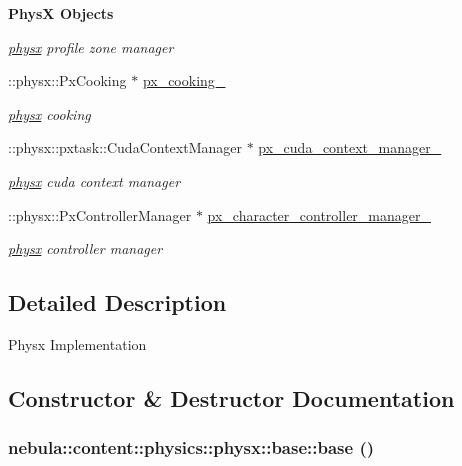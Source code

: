 \begin{Indent}{\bf PhysX Objects}
\begin{DoxyCompactItemize}
\begin{DoxyCompactList}\small\item\em \hyperlink{namespacenebula_1_1content_1_1physics_1_1physx}{physx} profile zone manager \item\end{DoxyCompactList}\item 
::physx::PxCooking $\ast$ \hyperlink{classnebula_1_1content_1_1physics_1_1physx_1_1base_a44f7e5a7f4bef961365059596c7cdfb8}{px\_\-cooking\_\-}
\begin{DoxyCompactList}\small\item\em \hyperlink{namespacenebula_1_1content_1_1physics_1_1physx}{physx} cooking \item\end{DoxyCompactList}\item 
::physx::pxtask::CudaContextManager $\ast$ \hyperlink{classnebula_1_1content_1_1physics_1_1physx_1_1base_a5ab3137c188f8c453466c5ec756345d0}{px\_\-cuda\_\-context\_\-manager\_\-}
\begin{DoxyCompactList}\small\item\em \hyperlink{namespacenebula_1_1content_1_1physics_1_1physx}{physx} cuda context manager \item\end{DoxyCompactList}\item 
::physx::PxControllerManager $\ast$ \hyperlink{classnebula_1_1content_1_1physics_1_1physx_1_1base_a5be7d9af5b7dcf31e4415b0bccc37d8a}{px\_\-character\_\-controller\_\-manager\_\-}
\begin{DoxyCompactList}\small\item\em \hyperlink{namespacenebula_1_1content_1_1physics_1_1physx}{physx} controller manager \item\end{DoxyCompactList}\end{DoxyCompactItemize}
\end{Indent}


\subsection{Detailed Description}
Physx Implementation 

\subsection{Constructor \& Destructor Documentation}
\hypertarget{classnebula_1_1content_1_1physics_1_1physx_1_1base_a3defb4af19d49479c2819e84e299871b}{
\subsubsection[{base}]{\setlength{\rightskip}{0pt plus 5cm}nebula::content::physics::physx::base::base ()}}
\label{classnebula_1_1content_1_1physics_1_1physx_1_1base_a3defb4af19d49479c2819e84e299871b}


